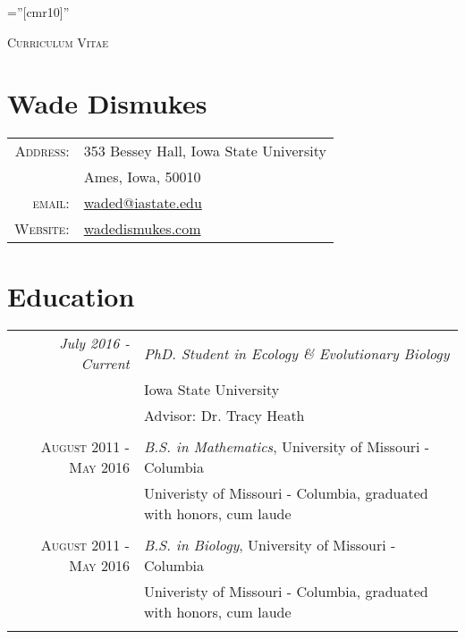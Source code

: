 \documentclass[12pt]{article}
\begin{document}

\pagestyle{empty} %

\font\fb=''[cmr10]'' %

\par{\centering
		{\Large \textsc{Curriculum Vitae}
	}\bigskip\par}

\section{\LARGE Wade Dismukes}

\begin{tabular}{rl}
    \textsc{Address:}   & 353 Bessey Hall, Iowa State University \\
                        & Ames, Iowa, 50010 \\
    \textsc{email:}     & \href{mailto:waded@iastate.edu}{waded@iastate.edu}\\
    \textsc{Website:}   & \href{https://www.wadedismukes.com/} {wadedismukes.com}
\end{tabular}

\section{Education}
\begin{tabular}{r|p{11cm}}
 \emph{July 2016 - Current} & \emph{PhD. Student in Ecology \& Evolutionary Biology} \\
 & Iowa State University \\
 & Advisor: Dr. Tracy Heath \\\multicolumn{2}{c}{} \\\textsc{August 2011 - May 2016} &\emph{B.S. in Mathematics}, University of Missouri - Columbia \\&\footnotesize{Univeristy of Missouri - Columbia, graduated with honors, cum laude}\\\multicolumn{2}{c}{} \\
 \textsc{August 2011 - May 2016} & \emph{B.S. in Biology}, University of Missouri - Columbia \\&\footnotesize{Univeristy of Missouri - Columbia, graduated with honors, cum laude}\\\multicolumn{2}{c}{} \\

\end{tabular}
\end{document}

